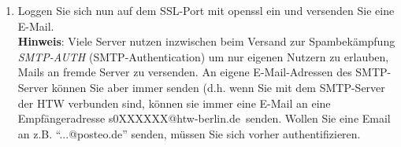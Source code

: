 \documentclass[paper=a4,fontsize=11pt]{scrartcl}%
\numberwithin{equation}{section}
\begin{document}
\begin{enumerate}
 	\item Loggen Sie sich nun auf dem SSL-Port mit openssl ein und versenden Sie eine E-Mail.\\
 	\textbf{Hinweis}: Viele Server nutzen inzwischen beim Versand zur Spambekämpfung \emph{SMTP-AUTH} (SMTP-Authentication) um nur eigenen Nutzern zu erlauben, Mails an fremde Server zu versenden. An eigene E-Mail-Adressen des SMTP-Server können Sie aber immer senden (d.h. wenn Sie mit dem SMTP-Server der HTW verbunden sind, können sie immer eine E-Mail an eine Empfängeradresse \glqq s0XXXXXX@htw-berlin.de\grqq\ senden. Wollen Sie eine Email an z.B. "`...@posteo.de"' senden, müssen Sie sich vorher authentifizieren.
\end{enumerate}
\end{document}
